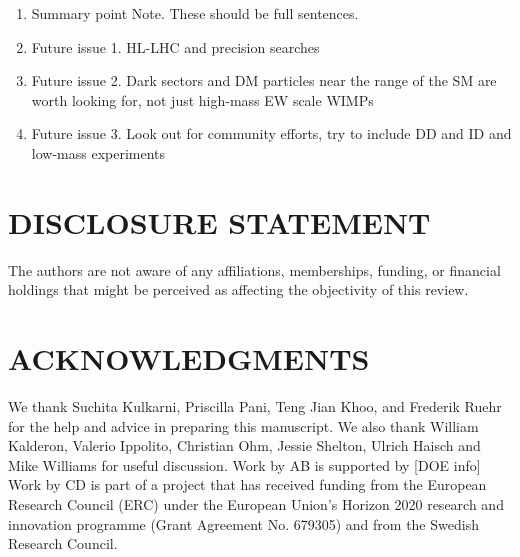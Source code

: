 \documentclass{ar-1col}
\begin{document}
\begin{issues}
\begin{enumerate}
\item Summary point Note. These should be full sentences.
\item Future issue 1. HL-LHC and precision searches
\item Future issue 2. Dark sectors and DM particles near the range of the SM are worth looking for, not just high-mass EW scale WIMPs
\item Future issue 3. Look out for community efforts, try to include DD and ID and low-mass experiments 
\end{enumerate}
\end{issues}

\section*{DISCLOSURE STATEMENT}
The authors are not aware of any affiliations, memberships, funding, or financial holdings that
might be perceived as affecting the objectivity of this review. 

\section*{ACKNOWLEDGMENTS}
We thank Suchita Kulkarni, Priscilla Pani, Teng Jian Khoo, and Frederik Ruehr for the help and advice in preparing this manuscript. 
We also thank William Kalderon, Valerio Ippolito, Christian Ohm, Jessie Shelton, Ulrich Haisch and Mike Williams for useful discussion.
Work by AB is supported by [DOE info]
Work by CD is part of a project that has received funding from the European Research Council (ERC) under the European Union's Horizon 2020 research and innovation programme (Grant Agreement No. 679305) and from the Swedish Research Council. 
%



\end{document}
